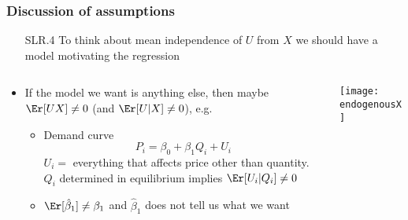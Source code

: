 \begin{frame}[allowframebreaks]
  \frametitle{Discussion of assumptions}
  \begin{itemize}
  \item[SLR.4] To think about mean independence of $U$ from $X$
    we should have a model motivating the regression
  \end{itemize}
  \begin{columns}[c] %
    \begin{column}{.48\textwidth}
      \begin{itemize}
      \item If the model we want is anything else, then maybe
        $\Er[UX] \neq 0$ (and $\Er[U | X] \neq 0$), e.g.\ 
        \begin{itemize}
        \item Demand curve 
          \[ P_i = \beta_0 + \beta_1 Q_i + U_i \]
          $U_i = $ everything that affects price other than
          quantity. $Q_i$ determined in equilibrium implies
          $\Er[U_i | Q_i] \neq 0$ 
        \item $\Er[\hat{\beta}_1] \neq \beta_1$ and $\hat{\beta}_1$ does
          not tell us what we want
        \end{itemize}
      \end{itemize}
    \end{column}
    \begin{column}{.48\textwidth}
      \texttt{[image: endogenousX]} \\
    \end{column}
  \end{columns}

\framebreak


\end{frame}
